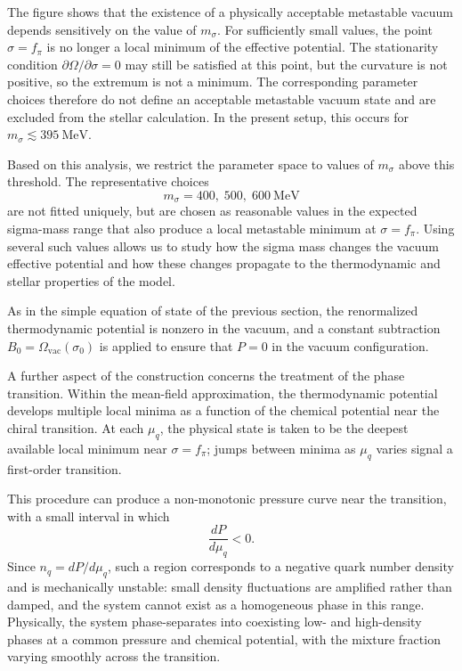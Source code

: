 The figure shows that the existence of a physically acceptable metastable
vacuum depends sensitively on the value of \(m_\sigma\). For sufficiently
small values, the point \(\sigma=f_\pi\) is no longer a local minimum of the
effective potential. The stationarity condition
\(\partial\Omega/\partial\sigma = 0\) may still be satisfied at this point, but
the curvature is not positive, so the extremum is not a minimum. The
corresponding parameter choices therefore do not define an acceptable
metastable vacuum state and are excluded from the stellar calculation. In the
present setup, this occurs for \(m_\sigma \lesssim 395~\mathrm{MeV}\).

Based on this analysis, we restrict the parameter space to values of
\(m_\sigma\) above this threshold. The representative choices
\[
    m_\sigma = 400,\; 500,\; 600~\mathrm{MeV}
\]
are not fitted uniquely, but are chosen as reasonable values in the expected
sigma-mass range that also produce a local metastable minimum at
\(\sigma=f_\pi\). Using several such values allows us to study how the sigma
mass changes the vacuum effective potential and how these changes propagate to
the thermodynamic and stellar properties of the model.

As in the simple equation of state of the previous section, the
renormalized thermodynamic potential is nonzero in the vacuum, and a
constant subtraction \(B_0 = \Omega_{\mathrm{vac}}(\sigma_0)\) is
applied to ensure that \(P = 0\) in the vacuum configuration.

A further aspect of the construction concerns the treatment of the
phase transition. Within the mean-field approximation, the
thermodynamic potential develops multiple local minima as a function
of the chemical potential near the chiral transition. At each
\(\mu_q\), the physical state is taken to be the deepest available
local minimum near \(\sigma = f_\pi\); jumps between minima as
\(\mu_q\) varies signal a first-order transition.

This procedure can produce a non-monotonic pressure curve near the
transition, with a small interval in which
\begin{equation}
\frac{dP}{d\mu_q} < 0.
\end{equation}
Since \(n_q = dP/d\mu_q\), such a region corresponds to a negative
quark number density and is mechanically unstable: small density
fluctuations are amplified rather than damped, and the system cannot
exist as a homogeneous phase in this range. Physically, the system
phase-separates into coexisting low- and high-density phases at a
common pressure and chemical potential, with the mixture fraction
varying smoothly across the transition.


